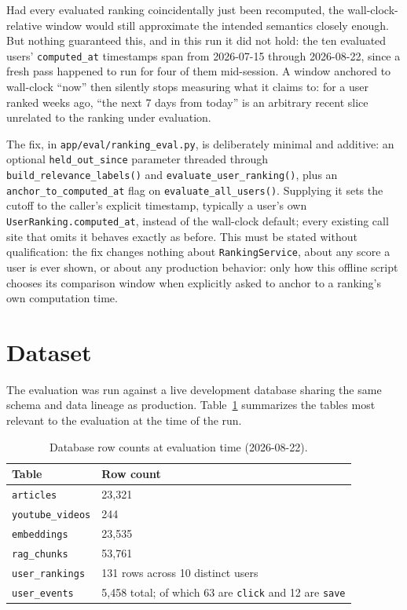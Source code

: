Had every evaluated ranking coincidentally just been recomputed, the wall-clock-relative window would still approximate the intended semantics closely enough. But nothing guaranteed this, and in this run it did not hold: the ten evaluated users' \texttt{computed\_at} timestamps span from 2026-07-15 through 2026-08-22, since a fresh pass happened to run for four of them mid-session. A window anchored to wall-clock ``now'' then silently stops measuring what it claims to: for a user ranked weeks ago, ``the next 7 days from today'' is an arbitrary recent slice unrelated to the ranking under evaluation.

The fix, in \texttt{app/eval/ranking\_eval.py}, is deliberately minimal and additive: an optional \texttt{held\_out\_since} parameter threaded through \texttt{build\_relevance\_labels()} and \texttt{evaluate\_user\_ranking()}, plus an \texttt{anchor\_to\_computed\_at} flag on \texttt{evaluate\_all\_users()}. Supplying it sets the cutoff to the caller's explicit timestamp, typically a user's own \texttt{UserRanking.computed\_at}, instead of the wall-clock default; every existing call site that omits it behaves exactly as before. This must be stated without qualification: the fix changes nothing about \texttt{RankingService}, about any score a user is ever shown, or about any production behavior: only how this offline script chooses its comparison window when explicitly asked to anchor to a ranking's own computation time.

\section{Dataset}
\label{sec:eval-dataset}

The evaluation was run against a live development database sharing the same schema and data lineage as production. Table~\ref{tab:eval-dataset} summarizes the tables most relevant to the evaluation at the time of the run.

\begin{table}[htbp]
\centering
\caption{Database row counts at evaluation time (2026-08-22).}
\label{tab:eval-dataset}
\begin{tabular}{|p{4cm}|p{9.5cm}|}
\hline
\textbf{Table} & \textbf{Row count} \\
\hline
\texttt{articles} & 23{,}321 \\
\hline
\texttt{youtube\_videos} & 244 \\
\hline
\texttt{embeddings} & 23{,}535 \\
\hline
\texttt{rag\_chunks} & 53{,}761 \\
\hline
\texttt{user\_rankings} & 131 rows across 10 distinct users \\
\hline
\texttt{user\_events} & 5{,}458 total; of which 63 are \texttt{click} and 12 are \texttt{save} \\
\hline
\end{tabular}
\end{table}

